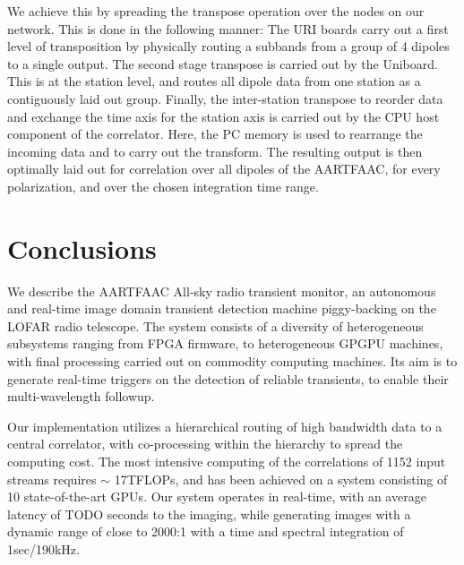 \documentclass{ws-jai}
\begin{document}
We achieve this by spreading the transpose operation over the nodes
on our network. This is done in the following manner:
The URI boards carry out a first  level of transposition by physically routing a
subbands  from a  group  of 4  dipoles  to  a single  output.  The second  stage
transpose is  carried out  by the Uniboard.  This is at  the station  level, and
routes  all dipole  data from  one  station as  a contiguously  laid out  group.
Finally, the inter-station transpose to reorder  data and exchange the time axis
for  the  station  axis  is  carried  out by  the  CPU  host  component  of  the
correlator. Here, the  PC memory is used  to rearrange the incoming  data and to
carry out  the transform. The  resulting output is  then optimally laid  out for
correlation over all  dipoles of the AARTFAAC, for every  polarization, and over
the chosen integration time range.


\section {\label{sec:conclusion} Conclusions}
We  describe the  AARTFAAC All-sky  radio transient  monitor, an  autonomous and
real-time image  domain transient detection  machine piggy-backing on  the LOFAR
radio telescope. The  system consists of a diversity  of heterogeneous subsystems
ranging  from  FPGA  firmware,  to   heterogeneous  GPGPU  machines,  with  final
processing carried out on commodity computing  machines.  Its aim is to generate
real-time  triggers on  the detection  of reliable  transients, to  enable their
multi-wavelength followup.

Our implementation utilizes  a hierarchical routing of high bandwidth  data to a
central  correlator,  with co-processing  within  the  hierarchy to  spread  the
computing cost.  The most intensive computing  of the correlations of  1152 input
streams requires $\sim$ 17TFLOPs, and has  been achieved on a system consisting of
10  state-of-the-art GPUs.  Our system  operates in  real-time, with  an average
latency of TODO  seconds to the imaging, while generating  images with a dynamic
range of close to 2000:1 with a time and spectral integration of 1sec/190kHz.
\end{document}

